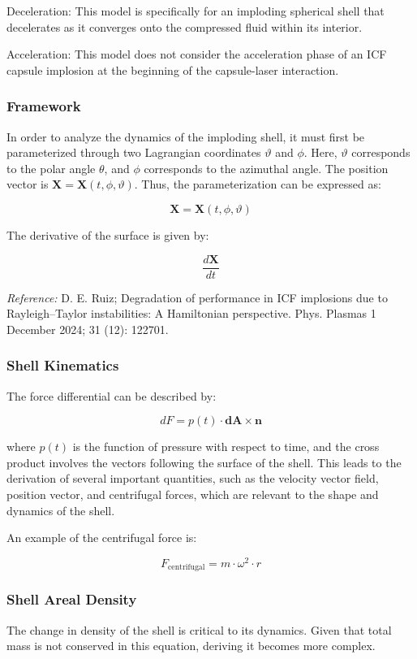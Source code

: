 \par Deceleration:
This model is specifically for an imploding spherical shell that decelerates as it converges onto the compressed fluid within its interior.

\par Acceleration:
This model does not consider the acceleration phase of an ICF capsule implosion at the beginning of the capsule-laser interaction.

\subsubsection{Framework}
In order to analyze the dynamics of the imploding shell, it must first be parameterized through two Lagrangian coordinates $\vartheta$ and $\phi$. Here, $\vartheta$ corresponds to the polar angle $\theta$, and $\phi$ corresponds to the azimuthal angle. The position vector is $\mathbf{X} = \mathbf{X}(t, \phi, \vartheta)$. Thus, the parameterization can be expressed as:

$$\mathbf{X} = \mathbf{X}(t, \phi, \vartheta)$$

The derivative of the surface is given by:

$$\frac{d\mathbf{X}}{dt}$$

\textit{Reference:} D. E. Ruiz; Degradation of performance in ICF implosions due to Rayleigh--Taylor instabilities: A Hamiltonian perspective. Phys. Plasmas 1 December 2024; 31 (12): 122701.

\subsubsection{Shell Kinematics}
The force differential can be described by:

$$dF = p(t) \cdot \mathbf{dA} \times \mathbf{n}$$

where $p(t)$ is the function of pressure with respect to time, and the cross product involves the vectors following the surface of the shell. This leads to the derivation of several important quantities, such as the velocity vector field, position vector, and centrifugal forces, which are relevant to the shape and dynamics of the shell.

An example of the centrifugal force is:

$$F_{\text{centrifugal}} = m \cdot \omega^2 \cdot r$$

\subsubsection{Shell Areal Density}
The change in density of the shell is critical to its dynamics. Given that total mass is not conserved in this equation, deriving it becomes more complex.

